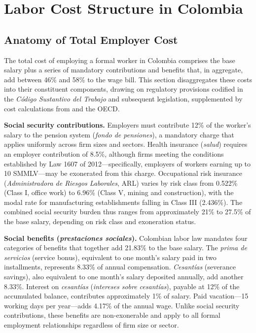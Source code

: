 \documentclass{article}
\begin{document}
\section{Labor Cost Structure in Colombia}
\label{sec:labor_costs}

\subsection{Anatomy of Total Employer Cost}
\label{subsec:cost_anatomy}

The total cost of employing a formal worker in Colombia comprises the base salary plus a series of mandatory contributions and benefits that, in aggregate, add between 46\% and 58\% to the wage bill. This section disaggregates these costs into their constituent components, drawing on regulatory provisions codified in the \textit{C\'odigo Sustantivo del Trabajo} and subsequent legislation, supplemented by cost calculations from \cite{anif2018} and the OECD.

\textbf{Social security contributions.} Employers must contribute 12\% of the worker's salary to the pension system (\textit{fondo de pensiones}), a mandatory charge that applies uniformly across firm sizes and sectors. Health insurance (\textit{salud}) requires an employer contribution of 8.5\%, although firms meeting the conditions established by Law 1607 of 2012---specifically, employers of workers earning up to 10 SMMLV---may be exonerated from this charge. Occupational risk insurance (\textit{Administradora de Riesgos Laborales}, ARL) varies by risk class from 0.522\% (Class I, office work) to 6.96\% (Class V, mining and construction), with the modal rate for manufacturing establishments falling in Class III (2.436\%). The combined social security burden thus ranges from approximately 21\% to 27.5\% of the base salary, depending on risk class and exoneration status.

\textbf{Social benefits (\textit{prestaciones sociales}).} Colombian labor law mandates four categories of benefits that together add 21.83\% to the base salary. The \textit{prima de servicios} (service bonus), equivalent to one month's salary paid in two installments, represents 8.33\% of annual compensation. \textit{Cesant\'ias} (severance savings), also equivalent to one month's salary deposited annually, add another 8.33\%. Interest on \textit{cesant\'ias} (\textit{intereses sobre cesant\'ias}), payable at 12\% of the accumulated balance, contributes approximately 1\% of salary. Paid vacation---15 working days per year---adds 4.17\% of the annual wage. Unlike social security contributions, these benefits are non-exonerable and apply to all formal employment relationships regardless of firm size or sector.
\end{document}
